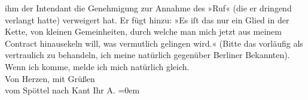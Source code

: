 \begin{ledgroupsized}[t]{13cm}
               ihm der Intendant die
               Genehmigung zur Annahme des »Ruf« (die er
               dringend verlangt hatte) verweigert hat. Er fügt hinzu: »Es iſt das nur ein Glied in
               der Kette, {\pb}von kleinen
               Gemeinheiten, durch welche man mich jetzt aus meinem Contract hinausekeln will, was
               vermutlich gelingen wird.« (Bitte das vorläufig als vertraulich zu behandeln, ich
               meine natürlich gegenüber Berliner Bekannten). \pend
           \pstart
           Wenn ich komme, melde ich mich natürlich gleich. {\\[\baselineskip]}Von Herzen, mit Grüßen
               {\\[\baselineskip]}vom Spöttel nach Kant Ihr \spacefill\mbox{A.}\pend
           \leftskip=0em{}
         
         \endnumbering{}\end{ledgroupsized}\begin{anhang}\end{anhang}\newcommand{\dateiname}{L03002}\newcommand{\titel}{Arthur Schnitzler an Felix Salten, 30. 1. 1906}\newcommand{\editorInnen}{Martin Anton Müller und Laura Untner}
      